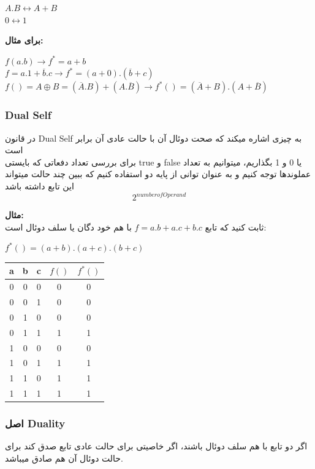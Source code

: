 \documentclass[pt, a5paper]{article}
\begin{document}
\raggedright
$A.B \leftrightarrow A+B$\\
$0 \leftrightarrow 1$

\raggedleft
\justifying
\textbf{برای مثال:}\\

\raggedright
$f(a.b) \rightarrow f^{*} = a+b$\\
$f = a.1 + \overline{b}.c \rightarrow f^{*}=(a+0) . (\overline{b}+c) $\\
$f()= A \oplus B = (\overline{A}.B) + (A.\overline{B}) \rightarrow f^{*}()= (\overline{A}+B) . (A+\overline{B})$


\raggedleft
\justifying
\subsubsection{Dual Self}
در قانون Dual Self به چیزی اشاره میکند که صحت دوئال آن با حالت عادی آن برابر است\\
برای بررسی تعداد دفعاتی که بایستی true و false یا 0 و 1 بگذاریم، میتوانیم به تعداد عملوندها توجه کنیم و به عنوان توانی از پایه دو استفاده کنیم که ببین چند حالت میتواند این تابع داشته باشد\\
\begin{equation}
	2^{number of Operand}
\end{equation}


\textbf{مثال:}\\
ثابت کنید که تابع
$f=a.b + a.c + b.c$
با هم خود دگان یا سلف دوئال است:\\

\raggedright
$f^{*}() = (a+b).(a+c).(b+c)$

\center
\begin{LTR}
\begin{tabular}{ c c c | c | c}
	a & b & c & $f()$ & $f^{*}()$\\
	\hline
	0 & 0 & 0 & 0 & 0 \\ 				
	0 & 0 & 1 & 0 & 0\\
	0 & 1 & 0 & 0 & 0\\
	0 & 1 & 1 & 1 & 1\\
	1 & 0 & 0 & 0 & 0\\
	1 & 0 & 1 & 1 & 1\\
	1 & 1 & 0 & 1 & 1\\
	1 & 1 & 1 & 1 & 1\\
\end{tabular}
\end{LTR}
\raggedleft
\justifying

\subsubsection{اصل Duality}
اگر دو تابع با هم سلف دوئال باشند، اگر خاصیتی برای حالت عادی تابع صدق کند برای حالت دوئال آن هم صادق میباشد.\\
\end{document}
